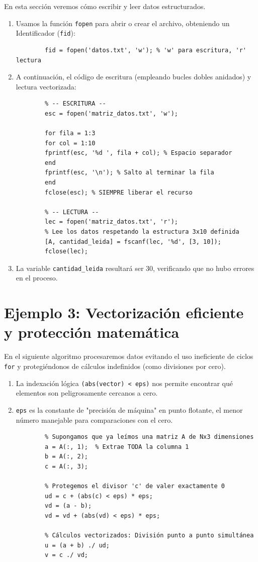 En esta sección veremos cómo escribir y leer datos estructurados.
\begin{enumerate}
	\item Usamos la función \texttt{fopen} para abrir o crear el archivo, obteniendo un Identificador (\texttt{fid}):
	\begin{verbatim}
		fid = fopen('datos.txt', 'w'); % 'w' para escritura, 'r' lectura
	\end{verbatim}
	
	\item A continuación, el código de escritura (empleando bucles dobles anidados) y lectura vectorizada:
	\begin{verbatim}
		% -- ESCRITURA --
		esc = fopen('matriz_datos.txt', 'w');
		
		for fila = 1:3
		for col = 1:10
		fprintf(esc, '%d ', fila + col); % Espacio separador
		end
		fprintf(esc, '\n'); % Salto al terminar la fila
		end
		fclose(esc); % SIEMPRE liberar el recurso
		
		% -- LECTURA --
		lec = fopen('matriz_datos.txt', 'r');
		% Lee los datos respetando la estructura 3x10 definida
		[A, cantidad_leida] = fscanf(lec, '%d', [3, 10]);
		fclose(lec);
	\end{verbatim}
	
	\item La variable \texttt{cantidad\_leida} resultará ser $30$, verificando que no hubo errores en el proceso.
\end{enumerate}

\section{Ejemplo 3: Vectorización eficiente y protección matemática}

En el siguiente algoritmo procesaremos datos evitando el uso ineficiente de ciclos \texttt{for} y protegiéndonos de cálculos indefinidos (como divisiones por cero).

\begin{enumerate}
	\item La indexación lógica \verb-(abs(vector) < eps)- nos permite encontrar qué elementos son peligrosamente cercanos a cero.
	\item \texttt{eps} es la constante de "precisión de máquina" en punto flotante, el menor número manejable para comparaciones con el cero.
	
	\begin{verbatim}
		% Supongamos que ya leímos una matriz A de Nx3 dimensiones
		a = A(:, 1);  % Extrae TODA la columna 1
		b = A(:, 2);
		c = A(:, 3);
		
		% Protegemos el divisor 'c' de valer exactamente 0
		ud = c + (abs(c) < eps) * eps; 
		vd = (a - b);
		vd = vd + (abs(vd) < eps) * eps;
		
		% Cálculos vectorizados: División punto a punto simultánea
		u = (a + b) ./ ud;  
		v = c ./ vd;        
	\end{verbatim}
\end{enumerate}